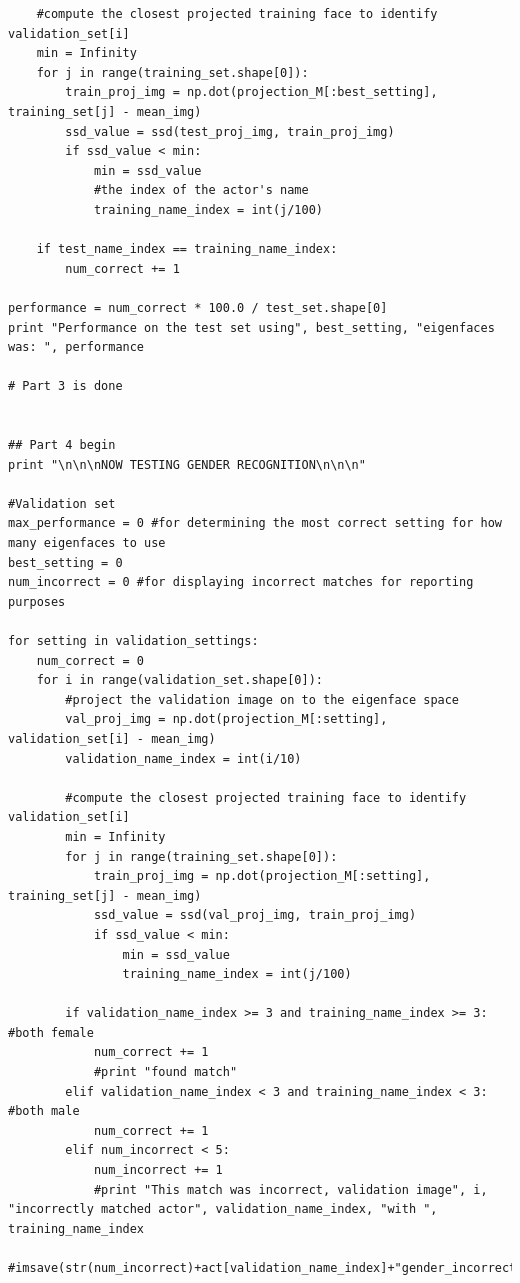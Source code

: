 \documentclass{article}
\begin{document}
\begin{lstlisting}
    #compute the closest projected training face to identify validation_set[i]
    min = Infinity
    for j in range(training_set.shape[0]):
        train_proj_img = np.dot(projection_M[:best_setting], training_set[j] - mean_img)
        ssd_value = ssd(test_proj_img, train_proj_img)
        if ssd_value < min:
            min = ssd_value
            #the index of the actor's name
            training_name_index = int(j/100)

    if test_name_index == training_name_index:
        num_correct += 1
        
performance = num_correct * 100.0 / test_set.shape[0] 
print "Performance on the test set using", best_setting, "eigenfaces was: ", performance

# Part 3 is done


## Part 4 begin
print "\n\n\nNOW TESTING GENDER RECOGNITION\n\n\n"

#Validation set
max_performance = 0 #for determining the most correct setting for how many eigenfaces to use
best_setting = 0
num_incorrect = 0 #for displaying incorrect matches for reporting purposes

for setting in validation_settings:
    num_correct = 0
    for i in range(validation_set.shape[0]):
        #project the validation image on to the eigenface space
        val_proj_img = np.dot(projection_M[:setting], validation_set[i] - mean_img)
        validation_name_index = int(i/10)
         
        #compute the closest projected training face to identify validation_set[i]
        min = Infinity
        for j in range(training_set.shape[0]):
            train_proj_img = np.dot(projection_M[:setting], training_set[j] - mean_img)
            ssd_value = ssd(val_proj_img, train_proj_img)
            if ssd_value < min:
                min = ssd_value
                training_name_index = int(j/100)
        
        if validation_name_index >= 3 and training_name_index >= 3: #both female
            num_correct += 1
            #print "found match"
        elif validation_name_index < 3 and training_name_index < 3: #both male
            num_correct += 1
        elif num_incorrect < 5:
            num_incorrect += 1
            #print "This match was incorrect, validation image", i, "incorrectly matched actor", validation_name_index, "with ", training_name_index
            #imsave(str(num_incorrect)+act[validation_name_index]+"gender_incorrectly_matched_with"+act[training_name_index]+".jpg")


\end{lstlisting}
\end{document}
